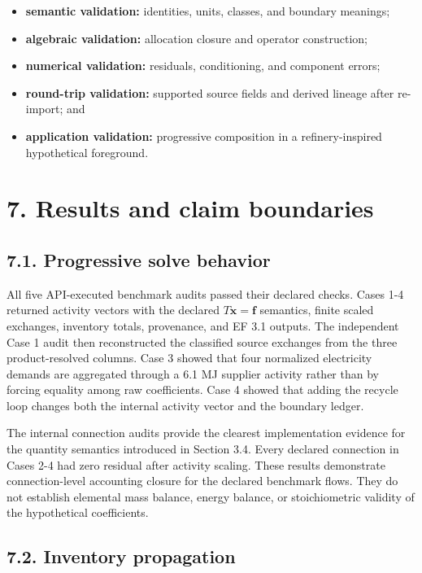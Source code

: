 \documentclass[
  10pt,
  a4paper,
  DIV=11,
  numbers=noendperiod]{scrartcl}
\providecommand{\tightlist}{%
  \setlength{\itemsep}{0pt}\setlength{\parskip}{0pt}}
\begin{document}
\begin{itemize}
\tightlist
\item
  \textbf{semantic validation:} identities, units, classes, and boundary
  meanings;
\item
  \textbf{algebraic validation:} allocation closure and operator
  construction;
\item
  \textbf{numerical validation:} residuals, conditioning, and component
  errors;
\item
  \textbf{round-trip validation:} supported source fields and derived
  lineage after re-import; and
\item
  \textbf{application validation:} progressive composition in a
  refinery-inspired hypothetical foreground.
\end{itemize}

\section{7. Results and claim
boundaries}\label{results-and-claim-boundaries}

\subsection{7.1. Progressive solve
behavior}\label{progressive-solve-behavior}

All five API-executed benchmark audits passed their declared checks.
Cases 1-4 returned activity vectors with the declared
\(T\mathbf x=\mathbf f\) semantics, finite scaled exchanges, inventory
totals, provenance, and EF 3.1 outputs. The independent Case 1 audit
then reconstructed the classified source exchanges from the three
product-resolved columns. Case 3 showed that four normalized electricity
demands are aggregated through a 6.1 MJ supplier activity rather than by
forcing equality among raw coefficients. Case 4 showed that adding the
recycle loop changes both the internal activity vector and the boundary
ledger.

The internal connection audits provide the clearest implementation
evidence for the quantity semantics introduced in Section 3.4. Every
declared connection in Cases 2-4 had zero residual after activity
scaling. These results demonstrate connection-level accounting closure
for the declared benchmark flows. They do not establish elemental mass
balance, energy balance, or stoichiometric validity of the hypothetical
coefficients.

\subsection{7.2. Inventory propagation}\label{inventory-propagation}
\end{document}
